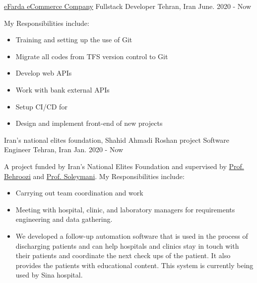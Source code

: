 

\begin{cventries}


  \cventry
  {\textcolor{awesome-red}{\href{https://www.efarda.ir/}{eFarda eCommerce Company}}} %
  {Fullstack Developer} %
  {Tehran, Iran} %
  {June. 2020 - Now} %
  {
  My Responsibilities include:
  \begin{itemize}
      \item
      Training and setting up the use of Git 
      \item
      Migrate all codes from TFS version control to Git
      \item
      Develop web APIs
      \item
      Work with bank external APIs
      \item 
      Setup CI/CD for
      \item
      Design and implement front-end of new projects
  \end{itemize}
  }
  
  \cventry
  {Iran's national elites foundation, Shahid Ahmadi Roshan project} %
  {Software Engineer} %
  {Tehran, Iran} %
  {Jan. 2020 - Now} %
  {
   A project funded by Iran's National Elites Foundation and supervised by \textcolor{awesome-red}{\href{http://ee.sharif.edu/~behroozi/}{Prof. Behroozi}} and \textcolor{awesome-red}{\href{http://sharif.edu/~soleymani/}{Prof. Soleymani}}.
   My Responsibilities include:
   \begin{itemize}
          \item
       Carrying out team coordination and work
       \item 
       Meeting with hospital, clinic, and laboratory managers for requirements engineering and data gathering.
       \item
      We developed a follow-up automation software that is used in the process of discharging patients and can help hospitals and clinics stay in touch with their patients and coordinate the next check ups of the patient. It also provides the patients with educational content. This system is currently being used by Sina hospital.
   \end{itemize}
  }


\end{cventries}
